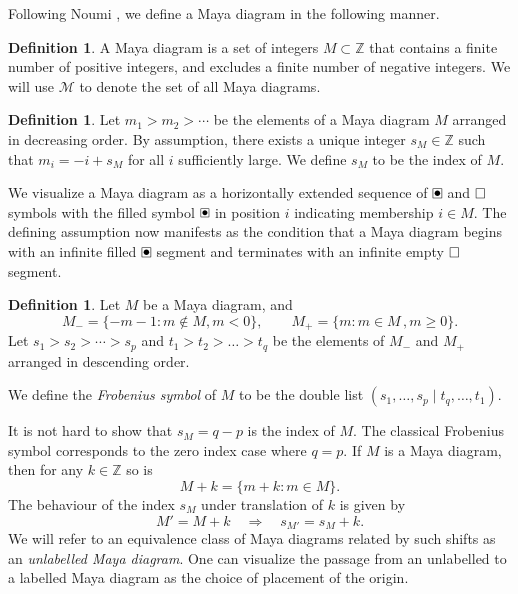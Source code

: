 \documentclass[10pt]{amsart}
\theoremstyle{definition}
\newcommand{\todo}[1]{\vspace{5 mm}\par \noindent
\marginpar{\textsc{ToDo}}
\framebox{\begin{minipage}[c]{\textwidth}
\tt #1 \end{minipage}}\vspace{5 mm}\par}
\newtheorem{definition}[thm]{Definition}
\numberwithin{equation}{section}
\numberwithin{figure}{section}
\newcommand{\Z}{\mathbb{Z}}
\newcommand{\cM}{\mathcal{M}}
\renewcommand{\boxdot}{{\ \clap{\raise0.25ex\hbox{$\bullet$}}\clap{$\square$}\ }}
\newcommand{\emptybox}{\hbox{$\square$}}
\begin{document}
Following Noumi \cite{noumi2004painleve}, we define a Maya diagram in the following manner.
\begin{definition}
  A Maya diagram is a set of integers $M\subset\Z$ that contains a
  finite number of positive integers, and excludes a finite number of
  negative integers.  We will use $\cM$ to denote the set of all Maya
  diagrams.
\end{definition}

\begin{definition}\label{def:index}
Let $m_1>m_2>\cdots$ be the elements of a Maya diagram $M$ arranged in decreasing order. By assumption, there exists a unique integer $s_M\in \Z$ such that $m_i = -i+s_M$ for all
$i$ sufficiently large. We define $s_M$ to be the index of $M$.
\end{definition}

We visualize a Maya diagram as a horizontally extended sequence of
$\boxdot$ and $\emptybox$ symbols with the filled symbol $\boxdot$ in
position $i$ indicating membership $i\in M$. The defining assumption
now manifests as the condition that a Maya diagram begins with an
infinite filled $\boxdot$ segment and terminates with an infinite
empty $\emptybox$ segment.

\begin{definition}

Let $M$ be a Maya diagram, and 
\[ M_-= \{ -m-1 \colon m\notin M, m<0\},\qquad M_+ = \{ m\colon m\in
M\,, m\geq 0 \}. \]
Let $s_1>s_2>\cdots > s_p$ and $t_1> t_2>\dots> t_q$ be the
elements of $M_-$ and $M_+$ arranged in descending order. 
 
We define the \textit{Frobenius symbol} of $M$ to be the double
list $(s_1,\ldots, s_p \mid t_q,\ldots, t_1)$.
\end{definition}
It is not hard to show that $s_M=q-p$ is the index of $M$.  The classical Frobenius symbol
\cite{andrews2004integer,olsson1994combinatorics,andrews1998theory} corresponds to the zero index case where $q=p$.
If $M$ is a Maya diagram, then for any $k\in \Z$ so is
\[ M+k = \{ m+k \colon m\in M \}.\]
The behaviour of the index $s_M$ under translation of $k$ is given by
\begin{equation}\label{eq:indexshift}
M'=M+k\quad \Rightarrow \quad s_{M'}=s_M+k.
\end{equation}
We will refer to an equivalence class of Maya diagrams related by such
shifts as an \textit{unlabelled Maya diagram}. One can visualize the
passage from an unlabelled to a labelled Maya diagram as the choice of
placement of the origin.
\end{document}
